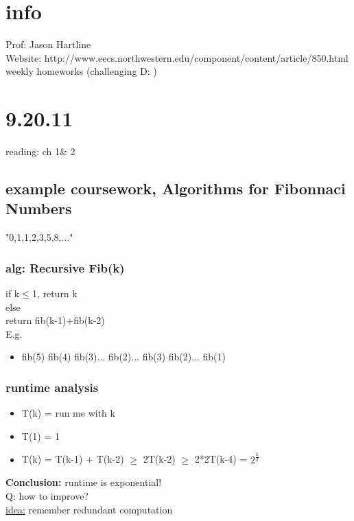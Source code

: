\documentclass[a4paper]{article}
\begin{document}
  \section{info}
    Prof: Jason Hartline\\
    Website: http://www.eecs.northwestern.edu/component/content/article/850.html\\
    weekly homeworks (challenging D: )\\
    
  \section{9.20.11}
    reading: ch 1\& 2\\
    \subsection{example coursework, Algorithms for Fibonnaci Numbers}
      "0,1,1,2,3,5,8,..."\\
      \subsubsection{alg: Recursive Fib(k)}
        if k$\le$1, return k\\
        else\\
        return fib(k-1)+fib(k-2)\\
        E.g.\\
        \begin{itemize}
          \item[] fib(5)
            \subitem fib(4)
              \subsubitem fib(3)...
              \subsubitem fib(2)...
            \subitem fib(3)
              \subsubitem fib(2)...
              \subsubitem fib(1)
        \end{itemize}
        \subsubsection{runtime analysis}
        \begin{itemize}
          \item[] T(k) = run me with k
          \item[] T(1) = 1
          \item[] T(k) = T(k-1) + T(k-2) $\ge$ 2T(k-2) $\ge$ 2*2T(k-4) = $2^{\frac{k}{2}}$
        \end{itemize}
        \textbf{Conclusion:} runtime is exponential!\\
        Q: how to improve?\\
        \underline{idea:} remember redundant computation
\end{document}
